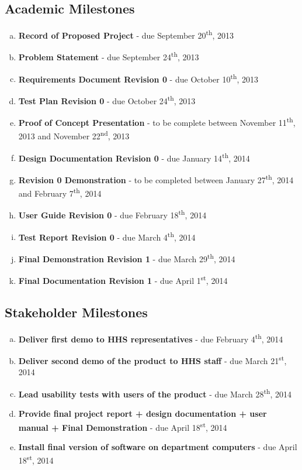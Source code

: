 \documentclass[paper=letter, fontsize=10pt]{scrartcl}
\numberwithin{equation}{section}		%
\numberwithin{figure}{section}			%
\numberwithin{table}{section}				%
\newcommand{\ts}{\textsuperscript}
\begin{document}
\subsection{Academic Milestones}
\begin{enumerate}[(a)]	
	\item \textbf{Record of Proposed Project} - due September 20\ts{th}, 2013
	\item \textbf{Problem Statement} - due September 24\ts{th}, 2013
	\item \textbf{Requirements Document Revision 0} - due October 10\ts{th}, 2013
	\item \textbf{Test Plan Revision 0} - due October 24\ts{th}, 2013
	\item \textbf{Proof of Concept Presentation} - to be complete between November 11\ts{th}, 2013 and November 22\ts{nd}, 2013
	\item \textbf{Design Documentation Revision 0} - due  January 14\ts{th}, 2014
	\item \textbf{Revision 0 Demonstration} - to be completed between January 27\ts{th}, 2014 and February 7\ts{th}, 2014
	\item \textbf{User Guide Revision 0} - due February 18\ts{th}, 2014
	\item \textbf{Test Report Revision 0} - due March 4\ts{th}, 2014
	\item \textbf{Final Demonstration Revision 1} - due March 29\ts{th}, 2014
	\item \textbf{Final Documentation Revision 1} - due April 1\ts{st}, 2014
\end{enumerate}
\subsection{Stakeholder Milestones}
\begin{enumerate}[(a)]	
	\item \textbf{Deliver first demo to HHS representatives} - due February 4\ts{th}, 2014
	\item \textbf{Deliver second demo of the product to HHS staff} - due March 21\ts{st}, 2014
	\item \textbf{Lead usability tests with users of the product} - due March 28\ts{th}, 2014
	\item \textbf{Provide final project report + design documentation + user manual + Final Demonstration} - due April 18\ts{st}, 2014
	\item \textbf{Install final version of software on department computers} - due April 18\ts{st}, 2014
\end{enumerate}
\end{document}
